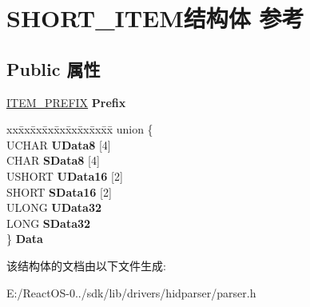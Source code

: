 \hypertarget{struct_s_h_o_r_t___i_t_e_m}{}\section{S\+H\+O\+R\+T\+\_\+\+I\+T\+E\+M结构体 参考}
\label{struct_s_h_o_r_t___i_t_e_m}
\subsection*{Public 属性}
\begin{DoxyCompactItemize}
\item 
\mbox{\label{struct_s_h_o_r_t___i_t_e_m_aa9baa4ee82c9c6bd9402c1f69a52675d}} 
\hyperlink{struct_i_t_e_m___p_r_e_f_i_x}{I\+T\+E\+M\+\_\+\+P\+R\+E\+F\+IX} {\bfseries Prefix}
\item 
\mbox{\label{struct_s_h_o_r_t___i_t_e_m_ae603be86e604dbb55de5fb9ea88bd97b}} 
\begin{tabbing}
xx\=xx\=xx\=xx\=xx\=xx\=xx\=xx\=xx\=\kill
union \{\\
\>UCHAR {\bfseries UData8} \mbox{[}4\mbox{]}\\
\>CHAR {\bfseries SData8} \mbox{[}4\mbox{]}\\
\>USHORT {\bfseries UData16} \mbox{[}2\mbox{]}\\
\>SHORT {\bfseries SData16} \mbox{[}2\mbox{]}\\
\>ULONG {\bfseries UData32}\\
\>LONG {\bfseries SData32}\\
\} {\bfseries Data}\\

\end{tabbing}\end{DoxyCompactItemize}


该结构体的文档由以下文件生成\+:\begin{DoxyCompactItemize}
\item 
E\+:/\+React\+O\+S-\/0../sdk/lib/drivers/hidparser/parser.\+h\end{DoxyCompactItemize}
